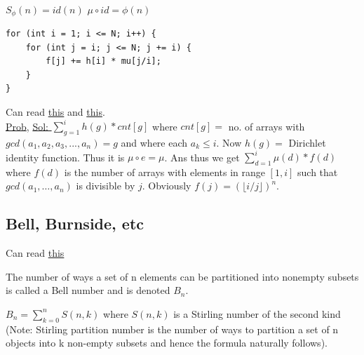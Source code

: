 \documentclass[8pt, a4paper, oneside, twocolumn]{extarticle}
\begin{document}
\\$S_{\phi}(n) = id(n)$
$\mu \circ id = \phi (n)$
\begin{verbatim}
for (int i = 1; i <= N; i++) { 
    for (int j = i; j <= N; j += i) {
        f[j] += h[i] * mu[j/i];
    } 
}
\end{verbatim}
Can read \href{https://github.com/sourabh2311/Competitive-Programming/blob/master/Reference%20Notes/Multiplicative.pdf}{this} and \href{https://www.quora.com/profile/Surya-Kiran/Posts/A-Dance-with-Mobius-Function}{this}.
\\\href{https://codeforces.com/contest/915/problem/G}{Prob}, \href{https://github.com/sourabh2311/Competitive-Programming/blob/master/CF/ER36/G.cpp}{Sol: }$\sum_{g = 1}^{i}h(g)*cnt[g]$ where $cnt[g] = $ no. of arrays with $gcd(a_1, a_2, a_3, ..., a_n) = g$ and where each $a_k \leq i$. Now $h(g) = $ Dirichlet identity function. Thus it is $\mu \circ e = \mu$. Ans thus we get $\sum_{d = 1}^{i}\mu(d)*f(d)$ where $f(d)$ is the number of arrays with elements in range $[1, i]$ such that $gcd(a_1, \dots, a_n)$ is divisible by $j$. Obviously $f(j) = (\lfloor i/j \rfloor)^n$.
\subsection{Bell, Burnside, etc}
Can read \href{https://github.com/sourabh2311/Competitive-Programming/blob/master/Reference%20Notes/cgt.pdf}{this}

The number of ways a set of n elements can be partitioned into nonempty subsets is called a Bell number and is denoted $B_n$. 

$B_n=\sum_{k=0}^nS(n,k)$  where $S(n,k)$ is a Stirling number of the second kind (Note: Stirling partition number is the number of ways to partition a set of n objects into k non-empty subsets and hence the formula naturally follows).
\end{document}
